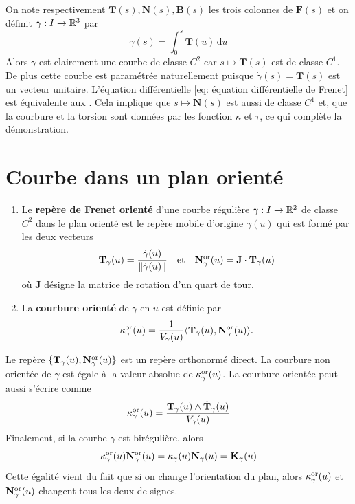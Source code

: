 {On note respectivement $\bm T(s), \bm N(s), \bm B(s)$ les trois colonnes de $\bm F(s)$ et on définit $\gamma : I \to \mathbb{R}^3$ par
\[
\gamma(s) = \int_0^s \bm T(u) \, \mathrm du
\]
Alors $\gamma$ est clairement une courbe de classe $C^2$ car $s \mapsto \bm T(s)$ est de classe $C^1$. De plus cette courbe est paramétrée naturellement puisque $\dot \gamma(s) = \bm T(s)$ est un vecteur unitaire. L'équation différentielle \eqref{eq: équation différentielle de Frenet} est équivalente aux . Cela implique que $s \mapsto \bm N(s)$ est aussi de classe $C^1$ et, que la courbure et la torsion sont données par les fonction $\kappa$ et $\tau$, ce qui complète la démonstration.
}

\section{Courbe dans un plan orienté}
\begin{definition}
	\begin{enumerate}
		\item Le \textbf{repère de Frenet orienté} d'une courbe régulière $\gamma : I \to \mathbb{R}^2$ de classe $C^2$ dans le plan orienté est le repère mobile d'origine $\gamma(u)$ qui est formé par les deux vecteurs
		\[
		\mathbf{T}_\gamma(u) = \frac{\dot \gamma(u)}{\left\| \dot \gamma(u) \right\|} \quad \text{et} \quad \mathbf{N}_\gamma^{\operatorname{or}}(u) = \mathbf{J} \cdot \mathbf{T}_\gamma(u)
		\]
		où $\bm J$ désigne la matrice de rotation d'un quart de tour.
		\item La \textbf{courbure orienté} de $\gamma$ en $u$ est définie par
		\[
		\kappa_\gamma^{\operatorname{or}} (u)= \frac{1}{V_\gamma(u)} \langle \dot{\mathbf{T}}_\gamma(u), \mathbf{N}_\gamma^{\operatorname{or}}(u) \rangle.
		\]
	\end{enumerate}
\end{definition}

\begin{remarque}
	Le repère $\{\mathbf{T}_\gamma(u), \mathbf{N}_\gamma^{\operatorname{or}}(u)\}$ est un repère orthonormé direct. La courbure non orientée de $\gamma$ est égale à la valeur absolue de $\kappa_\gamma^{\operatorname{or}}(u)$. La courbure orientée peut aussi s'écrire comme
	\[
	\kappa_\gamma^{\operatorname{or}}(u) = \frac{\mathbf{T}_\gamma(u) \land \dot{\mathbf{T}}_\gamma(u)}{V_\gamma(u)}
	\]
	Finalement, si la courbe $\gamma$ est birégulière, alors
	\[
	\kappa_\gamma^{\operatorname{or}}(u) \mathbf{N}_\gamma^{\operatorname{or}}(u) = \kappa_\gamma(u) \mathbf{N}_\gamma(u) = \mathbf{K}_\gamma(u)
	\]
	Cette égalité vient du fait que si on change l'orientation du plan, alors $\kappa_\gamma^{\operatorname{or}}(u)$ et $\mathbf{N}_\gamma^{\operatorname{or}}(u)$ changent tous les deux de signes.
\end{remarque}

